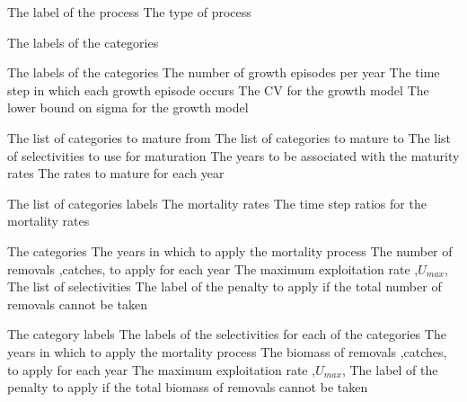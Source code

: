  {The label of the process}
 {The type of process}
\par\textbf{}\par
{} {The labels of the categories}
\par\textbf{}\par
{} {The labels of the categories}
 {The number of growth episodes per year}
 {The time step in which each growth episode occurs}
 {The CV for the growth model}
 {The lower bound on sigma for the growth model}
\par\textbf{}\par
{} {The list of categories to mature from}
 {The list of categories to mature to}
 {The list of selectivities to use for maturation}
 {The years to be associated with the maturity rates}
 {The rates to mature for each year}
\par\textbf{}\par
{} {The list of categories labels}
 {The mortality rates}
 {The time step ratios for the mortality rates}
\par\textbf{}\par
{} {The categories}
 {The years in which to apply the mortality process}
 {The number of removals ,catches, to apply for each year}
 {The maximum exploitation rate ,$U_{max}$,}
 {The list of selectivities}
 {The label of the penalty to apply if the total number of removals cannot be taken}
\par\textbf{}\par
{} {The category labels}
 {The labels of the selectivities for each of the categories}
 {The years in which to apply the mortality process}
 {The biomass of removals ,catches, to apply for each year}
 {The maximum exploitation rate ,$U_{max}$,}
 {The label of the penalty to apply if the total biomass of removals cannot be taken}
